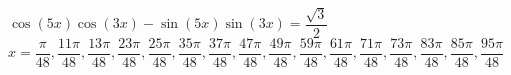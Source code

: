{ $\cos(5x)\cos(3x) - \sin(5x)\sin(3x) = \dfrac{\sqrt{3}}{2}$}
{ $x = \dfrac{\pi}{48}, \dfrac{11\pi}{48}, \dfrac{13\pi}{48}, \dfrac{23\pi}{48}, \dfrac{25\pi}{48}, \dfrac{35\pi}{48}, \dfrac{37\pi}{48}, \dfrac{47\pi}{48}, \dfrac{49\pi}{48}, \dfrac{59\pi}{48}, \dfrac{61\pi}{48}, \dfrac{71\pi}{48}, \dfrac{73\pi}{48}, \dfrac{83\pi}{48}, \dfrac{85\pi}{48}, \dfrac{95\pi}{48}$}
